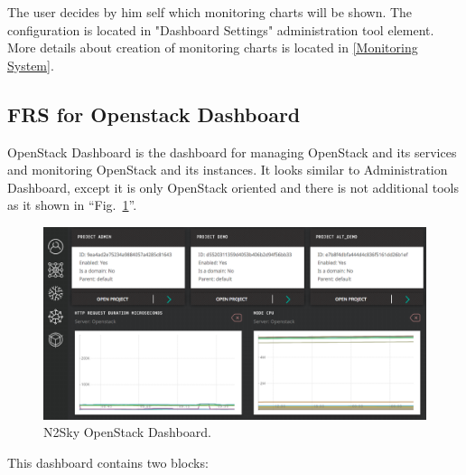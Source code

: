  
The user decides by him self which monitoring charts will be shown. The configuration is located in "Dashboard Settings" administration tool element. More details about creation of monitoring charts is located in \autoref{Monitoring System}. 


\subsection{FRS for Openstack Dashboard}\label{OpenStack Dashboard}

OpenStack Dashboard is the dashboard for managing OpenStack and its services and monitoring OpenStack and its instances. It looks similar to Administration Dashboard, except it is only OpenStack oriented and there is not additional tools as it shown in ``Fig.~\ref{fig:openstack_dashboard}''. 

\begin{figure}[htbp]
\begin{center}
  \includegraphics[width=\linewidth]{components/4/pics/openstack_dashboard.png}
  \caption{N2Sky OpenStack Dashboard.}
  \label{fig:openstack_dashboard}
\end{center}
\end{figure}
 

This dashboard contains two blocks:

